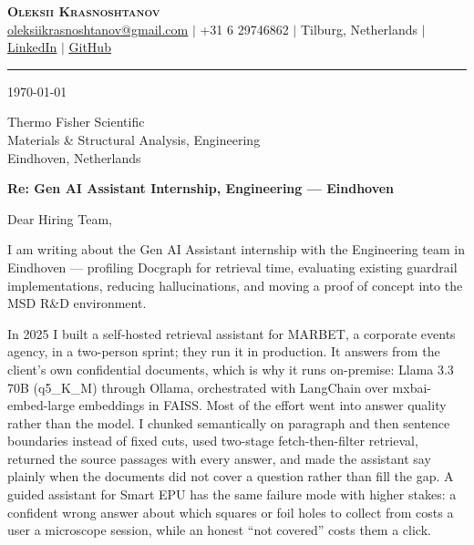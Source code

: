 \documentclass[letterpaper,11pt]{article}
\begin{document}
\begin{center}
    \textbf{\Huge \scshape Oleksii Krasnoshtanov} \\ \vspace{2pt}
    \small
    \href{mailto:oleksiikrasnoshtanov@gmail.com}{\underline{oleksiikrasnoshtanov@gmail.com}} $|$
    +31 6 29746862 $|$
    Tilburg, Netherlands $|$
    \href{https://www.linkedin.com/in/oleksii-krasnoshtanov/}{\underline{LinkedIn}} $|$
    \href{https://github.com/alex-krasnoshtanov}{\underline{GitHub}}
\end{center}

\vspace{6pt}
\hrule
\vspace{14pt}

\today

\vspace{10pt}

Thermo Fisher Scientific \\
Materials \& Structural Analysis, Engineering \\
Eindhoven, Netherlands

\vspace{10pt}

\textbf{Re: Gen AI Assistant Internship, Engineering --- Eindhoven}

\vspace{4pt}

Dear Hiring Team,

I am writing about the Gen AI Assistant internship with the Engineering team in
Eindhoven --- profiling Docgraph for retrieval time, evaluating existing
guardrail implementations, reducing hallucinations, and moving a proof of
concept into the MSD R\&D environment.

In 2025 I built a self-hosted retrieval assistant for MARBET, a corporate events
agency, in a two-person sprint; they run it in production. It answers from the
client's own confidential documents, which is why it runs on-premise: Llama 3.3
70B (q5\_K\_M) through Ollama, orchestrated with LangChain over
mxbai-embed-large embeddings in FAISS. Most of the effort went into answer
quality rather than the model. I chunked semantically on paragraph and then
sentence boundaries instead of fixed cuts, used two-stage fetch-then-filter
retrieval, returned the source passages with every answer, and made the
assistant say plainly when the documents did not cover a question rather than
fill the gap. A guided assistant for Smart EPU has the same failure mode with
higher stakes: a confident wrong answer about which squares or foil holes to
collect from costs a user a microscope session, while an honest ``not covered''
costs them a click.
\end{document}
